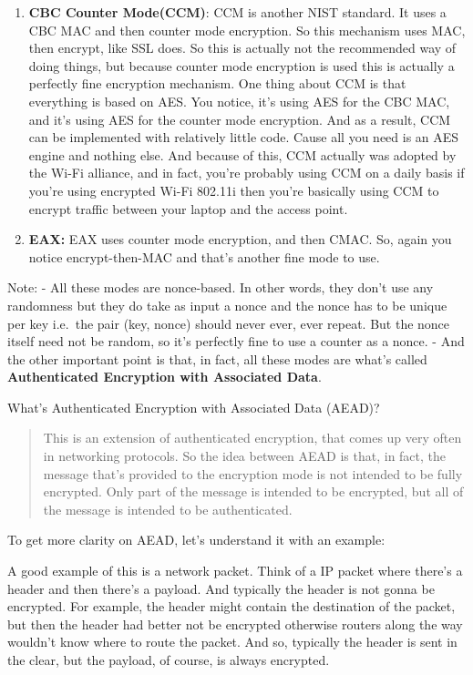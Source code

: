 \documentclass[11pt]{article}
\begin{document}
\begin{enumerate}
\def\labelenumi{\arabic{enumi}.}
\setcounter{enumi}{1}
\item
  \textbf{CBC Counter Mode(CCM)}: CCM is another NIST standard. It uses
  a CBC MAC and then counter mode encryption. So this mechanism uses
  MAC, then encrypt, like SSL does. So this is actually not the
  recommended way of doing things, but because counter mode encryption
  is used this is actually a perfectly fine encryption mechanism. One
  thing about CCM is that everything is based on AES. You notice, it's
  using AES for the CBC MAC, and it's using AES for the counter mode
  encryption. And as a result, CCM can be implemented with relatively
  little code. Cause all you need is an AES engine and nothing else. And
  because of this, CCM actually was adopted by the Wi-Fi alliance, and
  in fact, you're probably using CCM on a daily basis if you're using
  encrypted Wi-Fi 802.11i then you're basically using CCM to encrypt
  traffic between your laptop and the access point.
\item
  \textbf{EAX:} EAX uses counter mode encryption, and then CMAC. So,
  again you notice encrypt-then-MAC and that's another fine mode to use.
\end{enumerate}

Note: - All these modes are nonce-based. In other words, they don't use
any randomness but they do take as input a nonce and the nonce has to be
unique per key i.e.~the pair (key, nonce) should never ever, ever
repeat. But the nonce itself need not be random, so it's perfectly fine
to use a counter as a nonce. - And the other important point is that, in
fact, all these modes are what's called \textbf{Authenticated Encryption
with Associated Data}.

What's Authenticated Encryption with Associated Data (AEAD)?

\begin{quote}
This is an extension of authenticated encryption, that comes up very
often in networking protocols. So the idea between AEAD is that, in
fact, the message that's provided to the encryption mode is not intended
to be fully encrypted. Only part of the message is intended to be
encrypted, but all of the message is intended to be authenticated.
\end{quote}

To get more clarity on AEAD, let's understand it with an example:

A good example of this is a network packet. Think of a IP packet where
there's a header and then there's a payload. And typically the header is
not gonna be encrypted. For example, the header might contain the
destination of the packet, but then the header had better not be
encrypted otherwise routers along the way wouldn't know where to route
the packet. And so, typically the header is sent in the clear, but the
payload, of course, is always encrypted.
\end{document}
